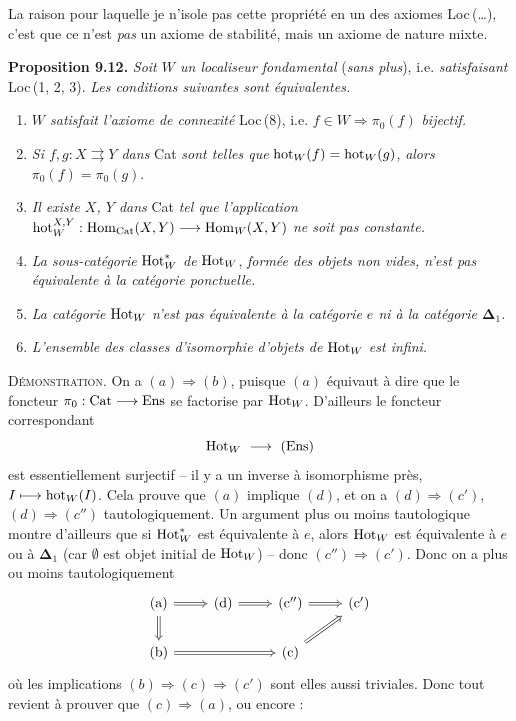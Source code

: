 La raison pour laquelle je n'isole pas cette propriété en un des axiomes Loc\,(\ldots), c'est que ce n'est \textit{pas} un axiome de stabilité, mais un axiome de nature mixte.

\textbf{Proposition 9.12.} \textit{Soit $W$ un localiseur fondamental} (\textit{sans plus}), i.e. \textit{satisfaisant} Loc\,(1, 2, 3). \textit{Les conditions suivantes sont équivalentes.}
\begin{enumerate}[leftmargin=*]
\item[a)] \textit{$W$ satisfait l'axiome de connexité} Loc\,(8), i.e. $f\in W\Longrightarrow\pi_0(f)$ \textit{bijectif.}
\item[b)] \textit{Si $f,g:X\rightrightarrows Y$ dans} Cat \textit{sont telles que} $\mathrm{hot}_W(f)=\mathrm{hot}_W(g)$, \textit{alors} $\pi_0(f)=\pi_0(g)$.
\item[c)] \textit{Il existe $X$, $Y$ dans} Cat \textit{tel que l'application} $\mathrm{hot}_W^{X,Y}:\mathrm{Hom}_{\mathrm{Cat}}(X,Y)\longrightarrow\mathrm{Hom}_W(X,Y)$ \textit{ne soit pas constante.}
\item[c$'$)] \textit{La sous-catégorie} $\mathrm{Hot}_W^*$ \textit{de} $\mathrm{Hot}_W$, \textit{formée des objets non vides, n'est pas équivalente à la catégorie ponctuelle.}
\item[c$''$)] \textit{La catégorie} $\mathrm{Hot}_W$ \textit{n'est pas équivalente à la catégorie $e$ ni à la catégorie $\boldsymbol{\Delta}_1$.}
\item[d)] \textit{L'ensemble des classes d'isomorphie d'objets de} $\mathrm{Hot}_W$ \textit{est infini.}
\end{enumerate}

\textsc{Démonstration}. On a $(a)\Longrightarrow(b)$, puisque $(a)$ équivaut à dire que le foncteur $\pi_0:\mathrm{Cat}\longrightarrow\mathrm{Ens}$ se factorise par $\mathrm{Hot}_W$. D'ailleurs le foncteur correspondant
\[
\Hot_W\ \longrightarrow\ (\mathrm{Ens})
\]
est essentiellement surjectif -- il y a un inverse à isomorphisme près, $I\longmapsto\mathrm{hot}_W(I)$. Cela prouve que $(a)$ implique $(d)$, et on a $(d)\Longrightarrow(c')$, $(d)\Longrightarrow(c'')$ tautologiquement. Un argument plus ou moins tautologique montre d'ailleurs que si $\mathrm{Hot}_W^*$ est équivalente à $e$, alors $\mathrm{Hot}_W$ est équivalente à $e$ ou à $\boldsymbol{\Delta}_1$ (car $\emptyset$ est objet initial de $\mathrm{Hot}_W$) -- donc $(c'')\Longrightarrow(c')$. Donc on a plus ou moins tautologiquement
\[
\begin{tikzcd}
(\mathrm{a}) \arrow[r, Rightarrow] \arrow[d, Rightarrow] & (\mathrm{d}) \arrow[r, Rightarrow] & (\mathrm{c}'') \arrow[r, Rightarrow] & (\mathrm{c}') \\
(\mathrm{b}) \arrow[rr, Rightarrow] & & (\mathrm{c}) \arrow[ru, Rightarrow] &
\end{tikzcd}
\]
où les implications $(b)\Longrightarrow(c)\Longrightarrow(c')$ sont elles aussi triviales. Donc
tout revient à prouver que $(c)\Longrightarrow(a)$, ou encore :

